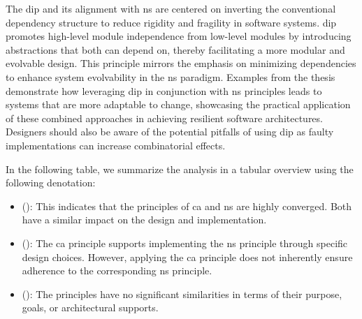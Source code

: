 The \gls{dip} and its alignment with \gls{ns} are centered on inverting the conventional
dependency structure to reduce rigidity and fragility in software systems. \gls{dip}
promotes high-level module independence from low-level modules by introducing abstractions
that both can depend on, thereby facilitating a more modular and evolvable design. This
principle mirrors the emphasis on minimizing dependencies to enhance system evolvability
in the \gls{ns} paradigm. Examples from the thesis demonstrate how leveraging \gls{dip} in
conjunction with \gls{ns} principles leads to systems that are more adaptable to change,
showcasing the practical application of these combined approaches in achieving resilient
software architectures. Designers should also be aware of the potential pitfalls of using
\gls{dip} as faulty implementations can increase combinatorial effects.

In the following table, we summarize the analysis in a tabular overview using the
following denotation:
\begin{itemize}
    \item {} (\fullConvergence): This indicates that the
    principles of \gls{ca} and \gls{ns} are highly converged. Both have a similar impact on
    the design and implementation.
    \item {} (\npartialConvergence): The \gls{ca} principle
    supports implementing the \gls{ns} principle through specific design choices. However,
    applying the \gls{ca} principle does not inherently ensure adherence to the corresponding
    \gls{ns} principle.
    \item {} (\noConvergence): The principles have no
    significant similarities in terms of their purpose, goals, or architectural supports.
\end{itemize}
    
